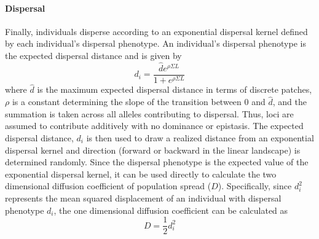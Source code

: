 \documentclass[11pt]{article}
\begin{document}
\paragraph{Dispersal}
Finally, individuals disperse according to an exponential dispersal kernel defined by each individual's dispersal phenotype. An individual's dispersal phenotype is the expected dispersal distance and is given by
\begin{equation}
d_{i} = \frac{\hat{d} e^{\rho\Sigma L}}{1+e^{\rho\Sigma L}} 
\end{equation}
where $\hat{d}$ is the maximum expected dispersal distance in terms of discrete patches, $\rho$ is a constant determining the slope of the transition between $0$ and $\hat{d}$, and the summation is taken across all alleles contributing to dispersal. Thus, loci are assumed to contribute additively with no dominance or epistasis. The expected dispersal distance, $d_{i}$ is then used to draw a realized distance from an exponential dispersal kernel and direction (forward or backward in the linear landscape) is determined randomly. Since the dispersal phenotype is the expected value of the exponential dispersal kernel, it can be used directly to calculate the two dimensional diffusion coefficient of population spread ($D$). Specifically, since $d_{i}^{2}$ represents the mean squared displacement of an individual with dispersal phenotype $d_{i}$, the one dimensional diffusion coefficient can be calculated as
\begin{equation}
D = \frac{1}{2}d_{i}^{2}
\end{equation}



\end{document}
